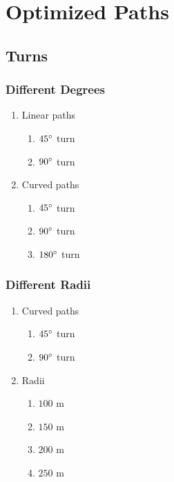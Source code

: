 \chapter{Optimized Paths}



\section{Turns}




\subsection{Different Degrees}

\begin{enumerate}
	\item Linear paths
	\begin{enumerate}
		\item $45 \degree$ turn
		\item $90 \degree$ turn
	\end{enumerate}
	\item Curved paths
	\begin{enumerate}
		\item $45 \degree$ turn
		\item $90 \degree$ turn
		\item $180 \degree$ turn
	\end{enumerate}
\end{enumerate}

\subsection{Different Radii}

\begin{enumerate}
	\item Curved paths
	\begin{enumerate}
		\item $45 \degree$ turn
		\item $90 \degree$ turn
	\end{enumerate}
	\item Radii
	\begin{enumerate}
		\item $100$ m
		\item $150$ m
		\item $200$ m
		\item $250$ m
	\end{enumerate}
\end{enumerate}

